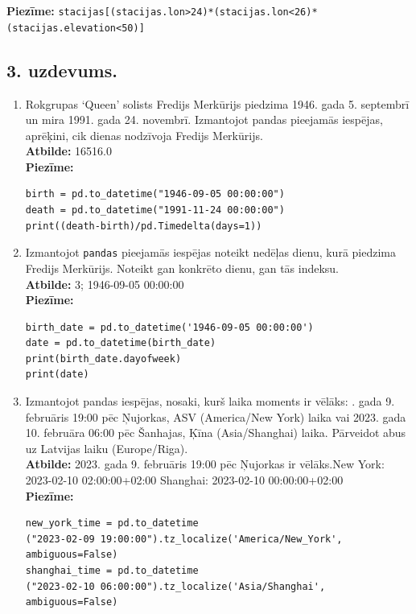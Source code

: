 \documentclass[12pt]{article}
\begin{document}
\noindent \textbf{Piezīme:} \texttt{stacijas[(stacijas.lon>24)*(stacijas.lon<26)*(stacijas.elevation<50)]}


\subsection*{3. uzdevums.}
    \begin{enumerate}
        \item Rokgrupas ‘Queen’ solists Fredijs Merkūrijs piedzima 1946. gada 5. septembrī un mira 1991. gada 24. novembrī. Izmantojot pandas pieejamās iespējas, aprēķini, cik dienas nodzīvoja Fredijs Merkūrijs.\\

        \textbf{Atbilde:} 16516.0\\

        \textbf{Piezīme:} \begin{verbatim}
birth = pd.to_datetime("1946-09-05 00:00:00")
death = pd.to_datetime("1991-11-24 00:00:00")
print((death-birth)/pd.Timedelta(days=1))
        \end{verbatim}  
        
        \item Izmantojot \texttt{pandas} pieejamās iespējas noteikt nedēļas dienu, kurā piedzima Fredijs Merkūrijs. Noteikt gan konkrēto dienu, gan tās indeksu.\\

        \textbf{Atbilde:} 3; 1946-09-05 00:00:00\\

        \textbf{Piezīme:} \begin{verbatim}
birth_date = pd.to_datetime('1946-09-05 00:00:00')
date = pd.to_datetime(birth_date)
print(birth_date.dayofweek)
print(date)
        \end{verbatim}      
        
        \item Izmantojot pandas iespējas, nosaki, kurš laika moments ir vēlāks: . gada 9. februāris 19:00 pēc Ņujorkas, ASV (America/New York) laika vai 2023. gada 10. februāra 06:00 pēc Šanhajas, Ķīna (Asia/Shanghai) laika. Pārveidot abus uz Latvijas laiku (Europe/Riga).\\

        \textbf{Atbilde:} 2023. gada 9. februāris 19:00 pēc Ņujorkas ir vēlāks.\newline New York: 2023-02-10 02:00:00+02:00 \newline Shanghai: 2023-02-10 00:00:00+02:00\\
        \textbf{Piezīme:} \begin{verbatim}
new_york_time = pd.to_datetime
("2023-02-09 19:00:00").tz_localize('America/New_York', ambiguous=False)
shanghai_time = pd.to_datetime
("2023-02-10 06:00:00").tz_localize('Asia/Shanghai', ambiguous=False)


\end{verbatim}
\end{enumerate}
\end{document}
